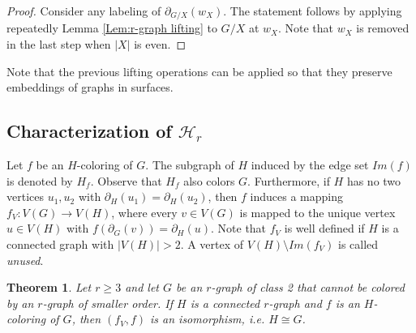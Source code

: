 \documentclass[a4paper,11pt]{article}
\newcommand{\ca}{\mathcal}
\newtheorem{theo}[defi]{Theorem}
\theoremstyle{remark}
\begin{document}
\begin{proof}
	
 


Consider any labeling of $\partial_{G/X}(w_X)$. The statement follows by applying repeatedly Lemma \ref{Lem:r-graph lifting} to  $G/X$ at $w_X$. Note that $w_X$ is removed in the last step when $\vert X \vert$ is even.
\end{proof}

Note that the previous lifting operations can be applied so that they preserve embeddings of graphs in surfaces.

\subsection{Characterization of $\ca H_r$}


Let $ f$ be an $ H $-coloring of $ G $.
The subgraph of $H$ induced by the edge set $Im(f)$ is denoted by $H_f$. Observe that $H_f$ also colors $G$. Furthermore, if $H$ has no two vertices $u_1,u_2$ with $\partial_H(u_1)=\partial_H(u_2)$, then $f$ induces a mapping $f_V\colon V(G) \to V(H)$, where every $v \in V(G)$ is mapped to the unique vertex $u \in V(H)$ with $f(\partial_G(v))=\partial_H(u)$. Note that $f_V$ is well defined if $H$ is a connected graph with $|V(H)|>2$. A vertex of $V(H)\setminus Im(f_V)$ is called \emph{unused}.






\begin{theo}
\label{theo:coloring_graphs_in_S(r,k)_generalisation}
Let $r \geq 3$ and let $G$ be an $r$-graph of class 2 that cannot be colored by an $r$-graph of smaller order. If $H$ is a connected $r$-graph and $f$ is an $H$-coloring of $G$, then $(f_V,f)$ is an isomorphism, i.e. $H \cong G$.
\end{theo}
\end{document}
